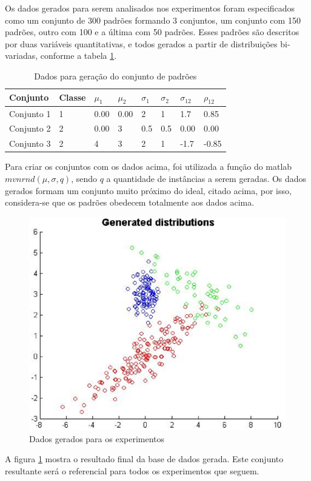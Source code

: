 

Os dados gerados para serem analisados nos experimentos foram especificados como um conjunto de 300 padrões formando 3 conjuntos, um conjunto com 150 padrões, outro com 100 e a última com 50 padrões. Esses padrões são descritos por duas variáveis quantitativas, e todos gerados a partir de distribuições bi-variadas, conforme a tabela \ref{tab:dados}.

\begin{table}[H]
\begin{center}
\begin{tabular}{|l|l|l|l|l|l|l|l|}
\hline
Conjunto 				& 	Classe	&	$\mu_1$	&	$\mu_2$	&	$\sigma_1$	&	$\sigma_2$	&	$\sigma_{12}$	&	$\rho_{12}$	\\
\hline %
Conjunto 1           	&	1		&   0.00   	&   0.00    &   	2   	&		1   	&		1.7		&		0.85	\\
Conjunto 2     			&   2		&   0.00	&   3		&   	0.5		&   	0.5   	&		0.00	&		0.00	\\
Conjunto 3     			&   2		&   4		&   3		&   	2		&   	1   	&		-1.7	&		-0.85	\\
\hline
\end{tabular}%
\end{center}   %
\caption{Dados para geração do conjunto de padrões}
\label{tab:dados}
\end{table}

Para criar os conjuntos com os dados acima, foi utilizada a função do matlab $mvnrnd(\mu, \sigma, q)$, sendo $q$ a quantidade de instâncias a serem geradas. Os dados gerados formam um conjunto muito próximo do ideal, citado acima, por isso, considera-se que os padrões obedecem totalmente aos dados acima.

\begin{figure}[H]
\center
\includegraphics[scale=0.60]{imagens/tecnicas/generatedDistributions.eps}
\caption{Dados gerados para os experimentos}
\label{fig:dados}
\end{figure}


A figura \ref{fig:dados} mostra o resultado final da base de dados gerada. Este conjunto resultante será o referencial para todos os experimentos que seguem.
